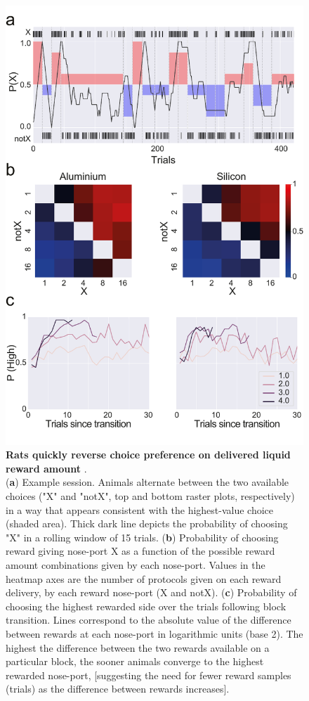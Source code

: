 \begin{figure}[ht] 
	\centering
	\includegraphics[width=1.0\linewidth]{Figures/Artboard 9.pdf}
	\caption{\textbf{Rats quickly reverse choice preference on delivered liquid reward amount }.\\
		(\textbf{a}) Example session. Animals alternate between the two available choices ("X" and "notX", top and bottom raster plots, respectively) in a way that appears consistent with the highest-value choice (shaded area). Thick dark line depicts the probability of choosing "X" in a rolling window of 15 trials. (\textbf{b}) Probability of choosing reward giving nose-port X as a function of the possible reward amount combinations given by each nose-port. Values in the heatmap axes are the number of protocols given on each reward delivery, by each reward nose-port (X and notX). (\textbf{c}) Probability of choosing the highest rewarded side over the trials following block transition. Lines correspond to the absolute value of the difference between rewards at each nose-port in logarithmic units (base 2). The highest the difference between the two rewards available on a particular block, the sooner animals converge to the highest rewarded nose-port, [suggesting the need for fewer reward samples (trials) as the difference between rewards increases]. }
	\label{fig:Behavior} 
\end{figure}

